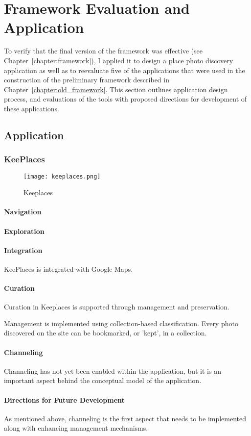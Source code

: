 \chapter{Framework Evaluation and Application}
\label{chapter:application}

To verify that the final version of the framework was effective (see Chapter~\ref{chapter:framework}), I applied it to design a place photo discovery application as well as to reevaluate five of the applications that were used in the construction of the preliminary framework described in Chapter~\ref{chapter:old_framework}. This section outlines application design process, and evaluations of the tools with proposed directions for development of these applications. 

{\section{Application}

{\subsection{KeePlaces}
\begin{figure}[ht!]
	\noindent
	\centering
	\texttt{[image: keeplaces.png]}
	\caption{Keeplaces}
	\label{fig:keeplaces} 
\end{figure}
{\subsubsection{Navigation}}
{\subsubsection{Exploration}}
{\subsubsection{Integration}
KeePlaces is integrated with Google Maps.
}
{\subsubsection{Curation}
Curation in Keeplaces is supported through management and preservation.

Management is implemented using collection-based classification.
Every photo discovered on the site can be bookmarked, or 'kept', in a collection.
}
{\subsubsection{Channeling}
Channeling has not yet been enabled within the application, but it is an important aspect behind the conceptual model of the application.
}
{\subsubsection{Directions for Future Development}
As mentioned above, channeling is the first aspect that needs to be implemented along with enhancing management mechanisms.
}
} %
} %



